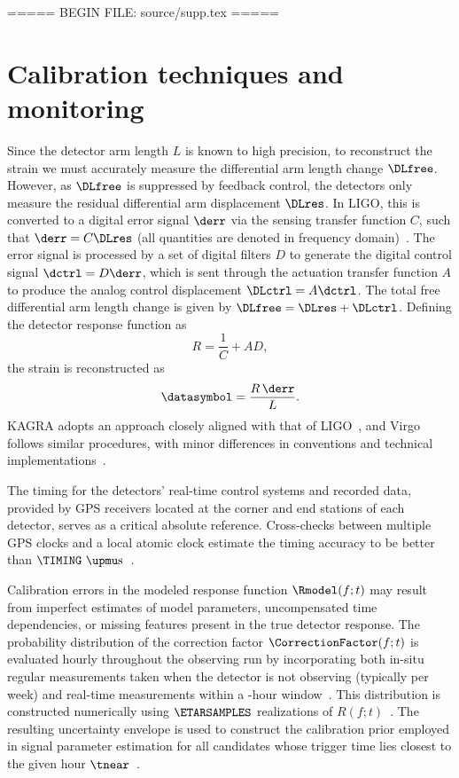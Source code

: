 ===== BEGIN FILE: source/supp.tex =====
\section{Calibration techniques and monitoring}

Since the detector arm length $L$ is known to high precision, to reconstruct the strain we must accurately measure the differential arm length change $\DLfree$.
However, as $\DLfree$ is suppressed by feedback control, the detectors only measure the residual differential arm displacement $\DLres$.
In \ac{LIGO}, this is converted to a digital error signal $\derr$ via the sensing transfer function $C$, such that $\derr =  C\DLres$ (all quantities are denoted in frequency domain)~\cite{LIGOScientific:2016xax,LIGOScientific:2017aaj,Viets:2017yvy,Sun:2020wke}.
The error signal is processed by a set of digital filters $D$ to generate the digital control signal $\dctrl = D \derr$, which is sent through the actuation transfer function $A$ to produce the analog control displacement $\DLctrl= A \dctrl$.
The total free differential arm length change is given by $\DLfree = \DLres + \DLctrl$.
Defining the detector response function as~\cite{LIGOScientific:2019hgc}
\begin{equation}
	R = \frac{1}{C} +AD,
\end{equation}
the strain is reconstructed as~\cite{Allen:1996aaa}
\begin{equation}
  \datasymbol = \frac{R \, \derr}{L}.
\end{equation}
KAGRA adopts an approach closely aligned with that of \ac{LIGO}~\cite{KAGRA:2020agh}, and Virgo follows similar procedures, with minor differences in conventions and technical implementations~\cite{VIRGO:2021umk,Grimaud:2025fli}.

The timing for the detectors' real-time control systems and recorded data, provided by \ac{GPS} receivers located at the corner and end stations of each detector, serves as a critical absolute reference.
Cross-checks between multiple \ac{GPS} clocks and a local atomic clock estimate the timing accuracy to be better than $\TIMING~\mathrm{\upmu s}$~\cite{Sullivan:2023cqg,Wade:2025tgt}.

Calibration errors in the modeled response function $\Rmodel(f;t)$ may result from imperfect estimates of model parameters, uncompensated time dependencies, or missing features present in the true detector response.
The probability distribution of the correction factor $\CorrectionFactor(f;t)$ is evaluated hourly throughout the observing run by incorporating both in-situ regular measurements taken when the detector is not observing (typically \SSMEAS{} per week) and real-time measurements within a \MONSPAN-hour window~\cite{Wade:2025tgt}.
This distribution is constructed numerically using $\ETARSAMPLES$ realizations of $R(f;t)$~\cite{LIGOScientific:2017aaj,Sun:2020wke}.
The resulting uncertainty envelope is used to construct the calibration prior employed in signal parameter estimation for all candidates whose trigger time lies closest to the given hour $\tnear$~\cite{LIGOScientific:2025yae}.

